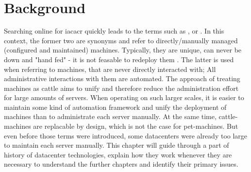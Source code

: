 \chapter{Background}




Searching online for \gls{iacacr} quickly leads to the terms such as ,  or . \cite{snowflake_servers}
In this context, the former two are synonyms and refer to directly/manually managed (configured and maintained) machines. Typically, they are unique, can never be down and "hand fed" - it is not feasable to redeploy them \cite{pets_vs_cattle}. The latter is used when referring to machines, that are never directly interacted with; All administrative interactions with them are automated.
The approach of treating machines as cattle aims to unify and therefore reduce the administration effort for large amounts of servers. When operating on such larger scales, it is easier to maintain some kind of automation framework and unify the deployment of machines than to administrate each server manually. At the same time, cattle-machines are replacable by design, which is not the case for pet-machines.
But even before those terms were introduced, some datacenters were already too large to maintain each server manually.
This chapter will guide through a part of history of datacenter technologies, explain how they work whenever they are necessary to understand the further chapters and identify their primary issues.


